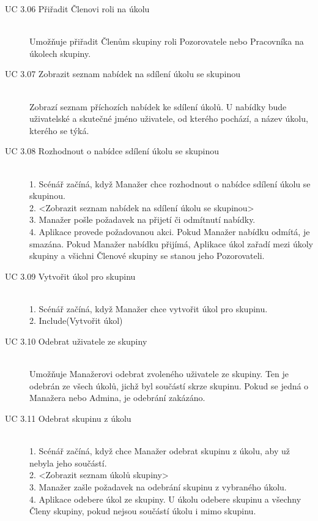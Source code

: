 \documentclass[thesis=B,czech]{FITthesis}[2012/06/26]
\begin{document}
\begin{description}
				\item[UC 3.06 Přiřadit Členovi roli na úkolu] \hfill \\
					Umožňuje přiřadit Členům skupiny roli Pozorovatele nebo Pracovníka na úkolech skupiny.
					
				\item[UC 3.07 Zobrazit seznam nabídek na sdílení úkolu se skupinou] \hfill \\
					Zobrazí seznam příchozích nabídek ke sdílení úkolů. U nabídky bude uživatelské a skutečné jméno uživatele, od kterého pochází, a název úkolu, kterého se týká.
					
				\item[UC 3.08 Rozhodnout o nabídce sdílení úkolu se skupinou] \hfill \\
					1. Scénář začíná, když Manažer chce rozhodnout o nabídce sdílení úkolu se skupinou. \\
					2. <Zobrazit seznam nabídek na sdílení úkolu se skupinou> \\
					3. Manažer pošle požadavek na přijetí či odmítnutí nabídky. \\
					4. Aplikace provede požadovanou akci. Pokud Manažer nabídku odmítá, je smazána. Pokud Manažer nabídku přijímá, Aplikace úkol zařadí mezi úkoly skupiny a všichni Členové skupiny se stanou jeho Pozorovateli.
				
				\item[UC 3.09 Vytvořit úkol pro skupinu] \hfill \\
					1. Scénář začíná, když Manažer chce vytvořit úkol pro skupinu. \\
					2. Include(Vytvořit úkol) %
				
				\item[UC 3.10 Odebrat uživatele ze skupiny] \hfill \\
					Umožňuje Manažerovi odebrat zvoleného uživatele ze skupiny. Ten je odebrán ze všech úkolů, jichž byl součástí skrze skupinu. Pokud se jedná o Manažera nebo Admina, je odebrání zakázáno. 
				
				\item[UC 3.11 Odebrat skupinu z úkolu] \hfill \\
					1. Scénář začíná, když chce Manažer odebrat skupinu z úkolu, aby už nebyla jeho součástí. \\
					2. <Zobrazit seznam úkolů skupiny> \\
					3. Manažer zašle požadavek na odebrání skupinu z vybraného úkolu. \\
					4. Aplikace odebere úkol ze skupiny. U úkolu odebere skupinu a všechny Členy skupiny, pokud nejsou součástí úkolu i mimo skupinu. \\
					

\end{description}
\end{document}
